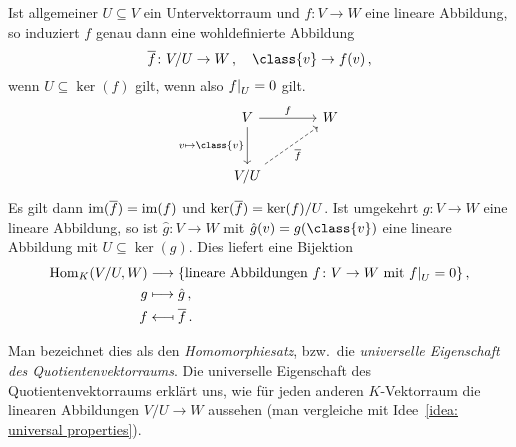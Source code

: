 \begin{remark}
  Ist allgemeiner $U \subseteq V$ ein Untervektorraum und $f \colon V \to W$ eine lineare Abbildung, so induziert $f$ genau dann eine wohldefinierte Abbildung
  \[
            \induced{f}
    \colon  V\!/U
    \to     W \,,
    \quad   \class{v}
    \to     f(v) \,,
  \]
  wenn $U \subseteq \ker(f)$ gilt, wenn also $\restrict{f}{U} = 0$ gilt.
  \[
    \begin{tikzcd}[sep = large]
        V
        \arrow{r}[above]{f}
        \arrow{d}[left]{v \mapsto \class{v}}
      & W
      \\
        V\!/U
        \arrow[dashed]{ru}[below right]{\induced{f}}
      & {}
    \end{tikzcd}
  \]
  Es gilt dann $\operatorname{im}(\overline{f}) = \operatorname{im}(f)$ und $\ker(\overline{f}) = \ker(f)/U$.
  Ist umgekehrt $g \colon V \to W$ eine lineare Abbildung, so ist $\hat{g} \colon V \to W$ mit $\hat{g}(v) = g(\class{v})$ eine lineare Abbildung mit $U \subseteq \ker(g)$.
  Dies liefert eine Bijektion
  \begin{align*}
                      \Hom_K(V/U,W)
    &\longrightarrow  \{ \text{lineare Abbildungen $f \colon V \to W$ mit $\restrict{f}{U}= 0$} \} \,,
    \\
                      g
    &\longmapsto      \hat{g} \,,
    \\
                      f
    &\longmapsfrom    \induced{f} \,.
  \end{align*}

  Man bezeichnet dies als den \emph{Homomorphiesatz}, bzw.\ die \emph{universelle Eigenschaft des Quotientenvektorraums}.
  Die universelle Eigenschaft des Quotientenvektorraums erklärt uns, wie für jeden anderen $K$-Vektorraum die linearen Abbildungen $V\!/U \to W$ aussehen (man vergleiche mit Idee~\ref{idea: universal properties}).
\end{remark}

